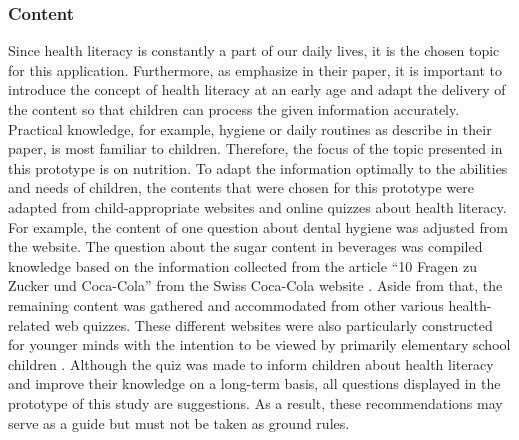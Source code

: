 \subsubsection{Content}
Since health literacy is constantly a part of our daily lives, it is the chosen topic for this application. Furthermore, as \textcite{velardo2017emphasizing} emphasize in their paper, it is important to introduce the concept of health literacy at an early age and adapt the delivery of the content so that children can process the given information accurately. \\
Practical knowledge, for example, hygiene or daily routines as \textcite{paakkari2012health} describe in their paper, is most familiar to children. Therefore, the focus of the topic presented in this prototype is on nutrition. To adapt the information optimally to the abilities and needs of children, the contents that were chosen for this prototype were adapted from child-appropriate websites and online quizzes about health literacy. 
For example, the content of one question about dental hygiene was adjusted from the \textcite{junior2019teeth} website. The question about the sugar content in beverages was compiled knowledge based on the information collected from the article ``10 Fragen zu Zucker und Coca-Cola'' from the Swiss Coca-Cola website \autocite{cola2017sugar}. Aside from that, the remaining content was gathered and accommodated from other various health-related web quizzes. These different websites were also particularly constructed for younger minds with the intention to be viewed by primarily elementary school children \autocite{swr2019nutrition, junior2019vitamins}. 
Although the quiz was made to inform children about health literacy and improve their knowledge on a long-term basis, all questions displayed in the prototype of this study are suggestions. As a result, these recommendations may serve as a guide but must not be taken as ground rules.

